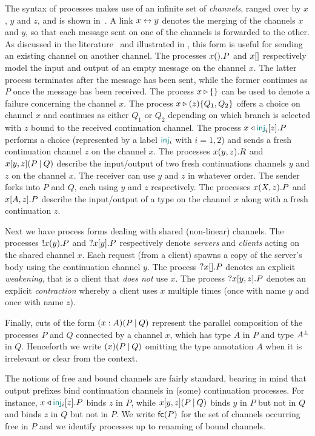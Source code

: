 The syntax of processes makes use of an infinite set of \emph{channels}, ranged
over by $x$, $y$ and $z$, and is shown in~.
%
A link $x\leftrightarrow y$ denotes the merging of the channels $x$ and $y$, so that each
message sent on one of the channels is forwarded to the other. As discussed in
the literature~\cite{LindleyMorris15} and illustrated in , this
form is useful for sending an existing channel on another channel.
%
The processes $x().P$ and $x[]$ respectively model the input and output
of an empty message on the channel $x$. The latter process terminates after the
message has been sent, while the former continues as $P$ once the message has
been received.
%
The process $x \triangleright \{\}$ can be used to denote a failure concerning the channel
$x$.
%
The process $\Case\x\z{Q_1}{Q_2}$ offers a choice on channel $x$ and continues
as either $Q_1$ or $Q_2$ depending on which branch is selected with $z$ bound to
the received continuation channel.
%
The process $\Select\x{\InTag_i}\z.P$ performs a choice (represented by a label
$\InTag_i$ with $i=1,2$) and sends a fresh continuation channel $z$ on the
channel $x$.
%
The processes $\Join\x\y\z.R$ and $\Fork\x\y\z{P}{Q}$ describe the input/output
of two fresh continuations channels $y$ and $z$ on the channel $x$. The receiver
can use $y$ and $z$ in whatever order. The sender forks into $P$ and $Q$, each
using $y$ and $z$ respectively.
%
The processes $x(X,z).P$ and $x[A,z].P$ describe the input/output
of a type on the channel $x$ along with a fresh continuation $z$.

Next we have process forms dealing with shared (non-linear) channels. The
processes ${!}x(y).P$ and ${?}x[y].P$ respectively denote \emph{servers}
and \emph{clients} acting on the shared channel $x$. Each request (from a
client) spawns a copy of the server's body using the continuation channel $y$.
The process ${?}x[].P$ denotes an explicit \emph{weakening}, that is a client
that \emph{does not} use $x$. The process ${?}x[y,z].P$ denotes an
explicit \emph{contraction} whereby a client uses $x$ multiple times (once with
name $y$ and once with name $z$).

Finally, cuts of the form $\Cut[A]\x{P}{Q}$ represent the parallel composition
of the processes $P$ and $Q$ connected by a channel $x$, which has type $A$ in
$P$ and type $A^{\bot}$ in $Q$. Henceforth we write $\Cut\x{P}{Q}$ omitting the
type annotation $A$ when it is irrelevant or clear from the context.

The notions of free and bound channels are fairly standard, bearing in mind that
output prefixes bind continuation channels in (some) continuation processes. For
instance, $\Select\x{\InTag_i}\z.P$ binds $z$ in $P$, while $\Fork\x\y\z{P}{Q}$
binds $y$ in $P$ but not in $Q$ and binds $z$ in $Q$ but not in $P$.
%
We write $\mathsf{fc}(P)$ for the set of channels occurring free in $P$ and we identify
processes up to renaming of bound channels.

